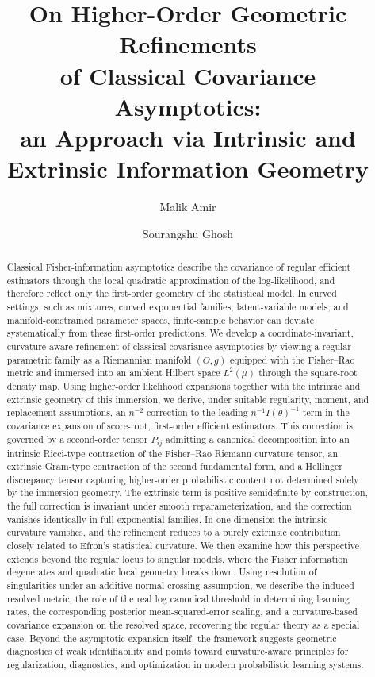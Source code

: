 \documentclass[11pt,letterpaper]{amsart}
\title[On Higher-Order Geometric Refinements of Classical Covariance Asymptotics]{On Higher-Order Geometric Refinements\\ of Classical Covariance Asymptotics:\\ an Approach via Intrinsic and\\ Extrinsic Information Geometry}
\author{Malik Amir}
\author{Sourangshu Ghosh}
\date{} %
\numberwithin{equation}{section}
\theoremstyle{plain}
\theoremstyle{definition}
\theoremstyle{remark}
\begin{document}
\maketitle

\begin{abstract}
Classical Fisher-information asymptotics describe the covariance of regular efficient estimators through the local quadratic approximation of the log-likelihood, and therefore reflect only the first-order geometry of the statistical model. In curved settings, such as mixtures, curved exponential families, latent-variable models, and manifold-constrained parameter spaces, finite-sample behavior can deviate systematically from these first-order predictions. We develop a coordinate-invariant, curvature-aware refinement of classical covariance asymptotics by viewing a regular parametric family as a Riemannian manifold \((\Theta,g)\) equipped with the Fisher--Rao metric and immersed into an ambient Hilbert space \(L^2(\mu)\) through the square-root density map. Using higher-order likelihood expansions together with the intrinsic and extrinsic geometry of this immersion, we derive, under suitable regularity, moment, and replacement assumptions, an \(n^{-2}\) correction to the leading \(n^{-1}I(\theta)^{-1}\) term in the covariance expansion of score-root, first-order efficient estimators. This correction is governed by a second-order tensor \(P_{ij}\) admitting a canonical decomposition into an intrinsic Ricci-type contraction of the Fisher--Rao Riemann curvature tensor, an extrinsic Gram-type contraction of the second fundamental form, and a Hellinger discrepancy tensor capturing higher-order probabilistic content not determined solely by the immersion geometry. The extrinsic term is positive semidefinite by construction, the full correction is invariant under smooth reparameterization, and the correction vanishes identically in full exponential families. In one dimension the intrinsic curvature vanishes, and the refinement reduces to a purely extrinsic contribution closely related to Efron's statistical curvature. We then examine how this perspective extends beyond the regular locus to singular models, where the Fisher information degenerates and quadratic local geometry breaks down. Using resolution of singularities under an additive normal crossing assumption, we describe the induced resolved metric, the role of the real log canonical threshold in determining learning rates, the corresponding posterior mean-squared-error scaling, and a curvature-based covariance expansion on the resolved space, recovering the regular theory as a special case. Beyond the asymptotic expansion itself, the framework suggests geometric diagnostics of weak identifiability and points toward curvature-aware principles for regularization, diagnostics, and optimization in modern probabilistic learning systems. 
\end{abstract}
\end{document}
